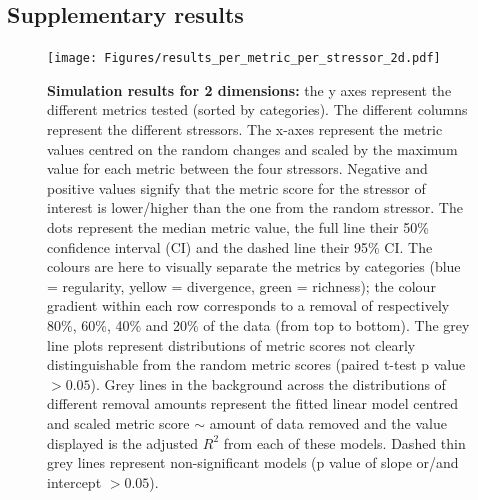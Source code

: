 \documentclass[12pt,letterpaper]{article}
\begin{document}
\subsection{Supplementary results}


\begin{figure}[!htbp]
\centering
   \texttt{[image: Figures/results\_per\_metric\_per\_stressor\_2d.pdf]}
\caption{\scriptsize{\textbf{Simulation results for 2 dimensions:} the y axes represent the different metrics tested (sorted by categories).
The different columns represent the different stressors. The x-axes represent the metric values centred on the random changes and scaled by the maximum value for each metric between the four stressors.
Negative and positive values signify that the metric score for the stressor of interest is lower/higher than the one from the random stressor.
The dots represent the median metric value, the full line their 50\% confidence interval (CI) and the dashed line their 95\% CI.
The colours are here to visually separate the metrics by categories (blue = regularity, yellow = divergence, green = richness); the colour gradient within each row corresponds to a removal of respectively 80\%, 60\%, 40\% and 20\% of the data (from top to bottom).
The grey line plots represent distributions of metric scores not clearly distinguishable from the random metric scores (paired t-test p value $> 0.05$).
Grey lines in the background across the distributions of different removal amounts represent the fitted linear model centred and scaled metric score $\sim$ amount of data removed and the value displayed is the adjusted $R^2$ from each of these models.
Dashed thin grey lines represent non-significant models (p value of slope or/and intercept $> 0.05$).
}}
\label{Fig:simulation_results_2d}
\end{figure}
\bigskip
\end{document}
